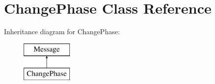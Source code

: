 \hypertarget{class_change_phase}{\section{Change\-Phase Class Reference}
\label{class_change_phase}
}
Inheritance diagram for Change\-Phase\-:\begin{figure}[H]
\begin{center}
\leavevmode
\includegraphics[height=2.000000cm]{class_change_phase}
\end{center}
\end{figure}
